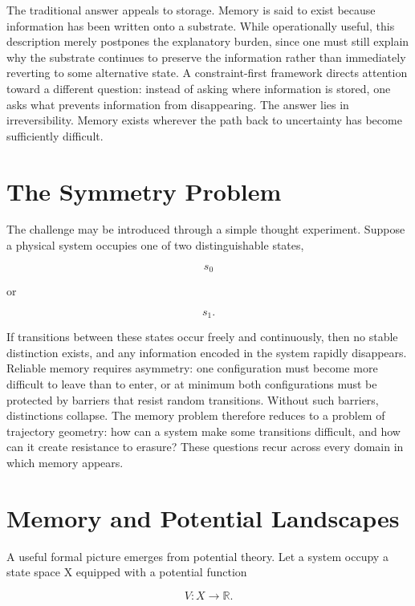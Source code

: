 \documentclass[11pt,oneside]{book}
\theoremstyle{plain}
\theoremstyle{definition}
\theoremstyle{remark}
\begin{document}
The traditional answer appeals to storage. Memory is said to exist because information has been written onto a substrate. While operationally useful, this description merely postpones the explanatory burden, since one must still explain why the substrate continues to preserve the information rather than immediately reverting to some alternative state. A constraint-first framework directs attention toward a different question: instead of asking where information is stored, one asks what prevents information from disappearing. The answer lies in irreversibility. Memory exists wherever the path back to uncertainty has become sufficiently difficult.

\section{The Symmetry Problem}

The challenge may be introduced through a simple thought experiment. Suppose a physical system occupies one of two distinguishable states,

\begin{equation}
s_0
\end{equation}

or

\begin{equation}
s_1.
\end{equation}

If transitions between these states occur freely and continuously, then no stable distinction exists, and any information encoded in the system rapidly disappears. Reliable memory requires asymmetry: one configuration must become more difficult to leave than to enter, or at minimum both configurations must be protected by barriers that resist random transitions. Without such barriers, distinctions collapse. The memory problem therefore reduces to a problem of trajectory geometry: how can a system make some transitions difficult, and how can it create resistance to erasure? These questions recur across every domain in which memory appears.

\section{Memory and Potential Landscapes}

A useful formal picture emerges from potential theory. Let a system occupy a state space X equipped with a potential function

\begin{equation}
V : X
\rightarrow
\mathbb{R}.
\end{equation}
\end{document}
